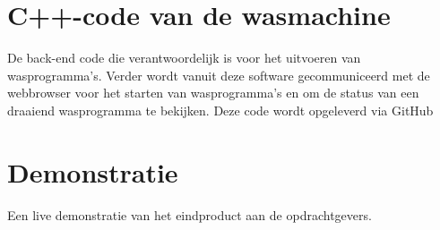 \section{C++-code van de wasmachine}
De back-end code die verantwoordelijk is voor het uitvoeren van wasprogramma's. Verder wordt vanuit deze software gecommuniceerd met de webbrowser voor het starten van wasprogramma's en om de status van een draaiend wasprogramma te bekijken. Deze code wordt opgeleverd via GitHub

\section{Demonstratie}
Een live demonstratie van het eindproduct aan de opdrachtgevers. 